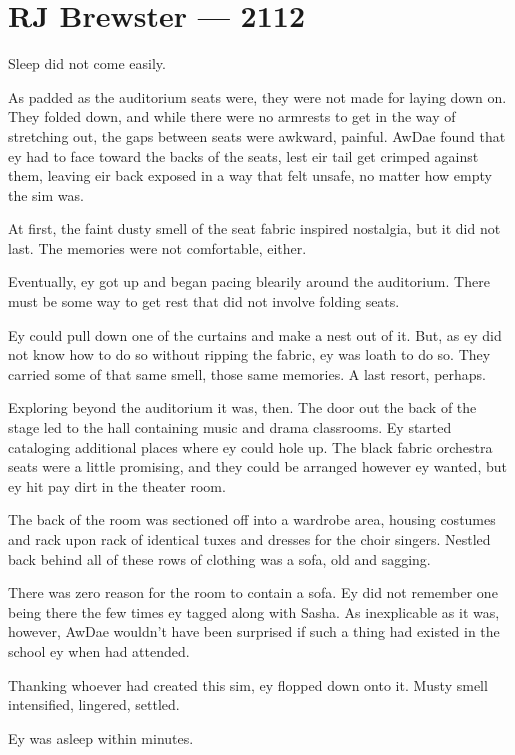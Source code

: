 \hypertarget{rj-brewster-2112}{%
\chapter*{RJ Brewster — 2112}\label{rj-brewster-2112}}

Sleep did not come easily.

As padded as the auditorium seats were, they were not made for laying down on. They folded down, and while there were no armrests to get in the way of stretching out, the gaps between seats were awkward, painful. AwDae found that ey had to face toward the backs of the seats, lest eir tail get crimped against them, leaving eir back exposed in a way that felt unsafe, no matter how empty the sim was.

At first, the faint dusty smell of the seat fabric inspired nostalgia, but it did not last. The memories were not comfortable, either.

Eventually, ey got up and began pacing blearily around the auditorium. There must be some way to get rest that did not involve folding seats.

Ey could pull down one of the curtains and make a nest out of it. But, as ey did not know how to do so without ripping the fabric, ey was loath to do so. They carried some of that same smell, those same memories. A last resort, perhaps.

Exploring beyond the auditorium it was, then. The door out the back of the stage led to the hall containing music and drama classrooms. Ey started cataloging additional places where ey could hole up. The black fabric orchestra seats were a little promising, and they could be arranged however ey wanted, but ey hit pay dirt in the theater room.

The back of the room was sectioned off into a wardrobe area, housing costumes and rack upon rack of identical tuxes and dresses for the choir singers. Nestled back behind all of these rows of clothing was a sofa, old and sagging.

There was zero reason for the room to contain a sofa. Ey did not remember one being there the few times ey tagged along with Sasha. As inexplicable as it was, however, AwDae wouldn't have been surprised if such a thing had existed in the school ey when had attended.

Thanking whoever had created this sim, ey flopped down onto it. Musty smell intensified, lingered, settled.

Ey was asleep within minutes.

